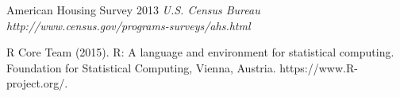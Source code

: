 \documentclass[twoside]{article}
\begin{document}
\begin{multicols}{2}
\begin{thebibliography}{99}
American Housing Survey 2013 {\em U.S. Census Bureau http://www.census.gov/programs-surveys/ahs.html}

R Core Team (2015). R: A language and environment for statistical computing. {\emR Foundation for Statistical Computing, Vienna, Austria. https://www.R-project.org/.}


\end{thebibliography}


\end{multicols}
\end{document}
